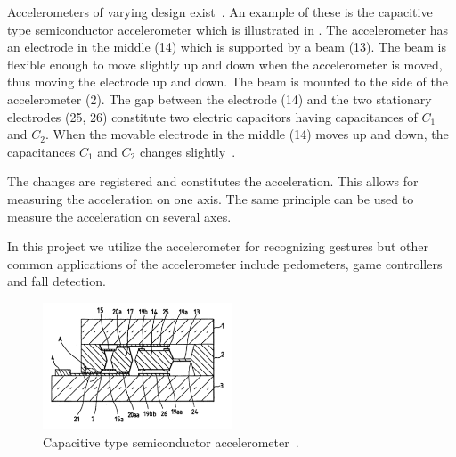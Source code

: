 Accelerometers of varying design exist~\cite[pp. 392-411]{Fraden:2112745}. An example of these is the capacitive type semiconductor accelerometer which is illustrated in . The accelerometer has an electrode in the middle (14) which is supported by a beam (13). The beam is flexible enough to move slightly up and down when the accelerometer is moved, thus moving the electrode up and down. The beam is mounted to the side of the accelerometer (2). The gap between the electrode (14) and the two stationary electrodes (25, 26) constitute two electric capacitors having capacitances of $C_1$ and $C_2$.
When the movable electrode in the middle (14) moves up and down, the capacitances $C_1$ and $C_2$ changes slightly~\cite{kloeck1993capacitive}.

The changes are registered and constitutes the acceleration. This allows for measuring the acceleration on one axis. The same principle can be used to measure the acceleration on several axes.

In this project we utilize the accelerometer for recognizing gestures but other common applications of the accelerometer include pedometers, game controllers and fall detection.

\begin{figure}
\centering
\includegraphics[width=0.5\textwidth]{images/accelerometer}
\caption{Capacitive type semiconductor accelerometer~\cite{kloeck1993capacitive}.}
\label{fig:accelerometer}
\end{figure}

